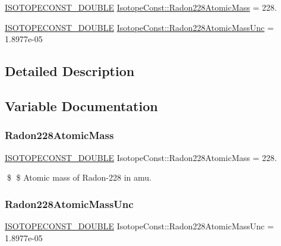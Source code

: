 \begin{DoxyCompactItemize}
\item 
\mbox{\hyperlink{group___isotope_const-_macros_ga8f45a7272ce02c0b4c65c44636ed719a}{I\+S\+O\+T\+O\+P\+E\+C\+O\+N\+S\+T\+\_\+\+D\+O\+U\+B\+LE}} \mbox{\hyperlink{group___isotope_const-_radon-_rn228_ga5afeae4b8380b52615f5aab19ad09a5b}{Isotope\+Const\+::\+Radon228\+Atomic\+Mass}} = 228.
\item 
\mbox{\hyperlink{group___isotope_const-_macros_ga8f45a7272ce02c0b4c65c44636ed719a}{I\+S\+O\+T\+O\+P\+E\+C\+O\+N\+S\+T\+\_\+\+D\+O\+U\+B\+LE}} \mbox{\hyperlink{group___isotope_const-_radon-_rn228_gabab1da9cb63b8801f815e44c38411e3f}{Isotope\+Const\+::\+Radon228\+Atomic\+Mass\+Unc}} = 1.\+8977e-\/05
\end{DoxyCompactItemize}


\subsection{Detailed Description}


\subsection{Variable Documentation}
\mbox{\label{group___isotope_const-_radon-_rn228_ga5afeae4b8380b52615f5aab19ad09a5b}} 
\subsubsection{\texorpdfstring{Radon228\+Atomic\+Mass}{Radon228AtomicMass}}
{\footnotesize\ttfamily \mbox{\hyperlink{group___isotope_const-_macros_ga8f45a7272ce02c0b4c65c44636ed719a}{I\+S\+O\+T\+O\+P\+E\+C\+O\+N\+S\+T\+\_\+\+D\+O\+U\+B\+LE}} Isotope\+Const\+::\+Radon228\+Atomic\+Mass = 228.}

\$ \$ Atomic mass of Radon-\/228 in amu. \mbox{\label{group___isotope_const-_radon-_rn228_gabab1da9cb63b8801f815e44c38411e3f}} 
\subsubsection{\texorpdfstring{Radon228\+Atomic\+Mass\+Unc}{Radon228AtomicMassUnc}}
{\footnotesize\ttfamily \mbox{\hyperlink{group___isotope_const-_macros_ga8f45a7272ce02c0b4c65c44636ed719a}{I\+S\+O\+T\+O\+P\+E\+C\+O\+N\+S\+T\+\_\+\+D\+O\+U\+B\+LE}} Isotope\+Const\+::\+Radon228\+Atomic\+Mass\+Unc = 1.\+8977e-\/05}

